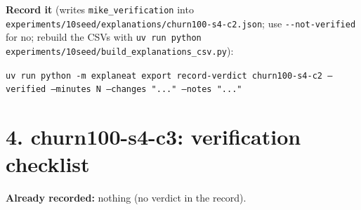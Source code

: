 \documentclass[a4paper,11pt]{article}
\begin{document}
\textbf{Record it} (writes \texttt{mike\_verification} into \texttt{experiments/10seed/explanations/churn100-s4-c2.json}; use \texttt{-{}-not-verified} for no; rebuild the CSVs with \texttt{uv run python experiments/10seed/build\_explanations\_csv.py}):

{\footnotesize\raggedright\texttt{uv run python -m explaneat export record-verdict churn100-s4-c2 --verified --minutes N --changes "..." --notes "..."}\par}


\clearpage
























\clearpage
\section*{4. churn100-s4-c3: verification checklist}
\label{rev:churn100-s4-c3}
\textbf{Already recorded:} nothing (no verdict in the record).
\end{document}
